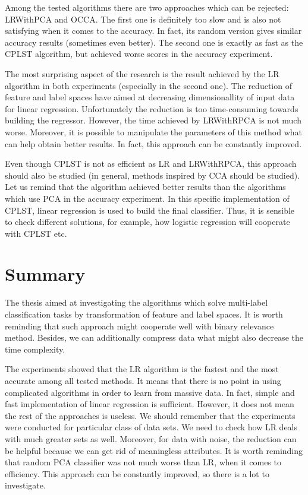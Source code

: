\documentclass[english,a4paper,twoside]{ppfcmthesis}
\begin{document}
Among the tested algorithms there are two approaches which can be rejected: LRWithPCA and OCCA. The first one is definitely too slow and is also not satisfying when it comes to the accuracy. In fact, its random version gives similar accuracy results (sometimes even better). The second one is exactly as fast as the CPLST algorithm, but achieved worse scores in the accuracy experiment. 

The most surprising aspect of the research is the result achieved by the LR algorithm in both experiments (especially in the second one). The reduction of feature and label spaces have aimed at decreasing dimensionallity of input data for linear regression. Unfortunately the reduction is too time-consuming towards building the regressor. However, the time achieved by LRWithRPCA is not much worse. Moreover, it is possible to manipulate the parameters of this method what can help obtain better results. In fact, this approach can be constantly improved.   

Even though CPLST is not as efficient as LR and LRWithRPCA, this approach should also be studied (in general, methods inspired by CCA should be studied). Let us remind that the algorithm achieved better results than the algorithms which use PCA in the accuracy experiment. In this specific implementation of CPLST, linear regression is used to build the final classifier. Thus, it is sensible to check different solutions, for example, how logistic regression will cooperate with CPLST etc.

\section{Summary}

The thesis aimed at investigating the algorithms which solve multi-label classification tasks by transformation of feature and label spaces. It is worth reminding that such approach might cooperate well with binary relevance method. Besides, we can additionally compress data what might also decrease the time complexity. 

The experiments showed that the LR algorithm is the fastest and the most accurate among all tested methods. It means that there is no point in using complicated algorithms in order to learn from massive data. In fact, simple and fast implementation of linear regression is sufficient. However, it does not mean the rest of the approaches is useless. We should remember that the experiments were conducted for particular class of data sets. We need to check how LR deals with much greater sets as well. Moreover, for data with noise, the reduction can be helpful because we can get rid of meaningless attributes. It is worth reminding that random PCA classifier was not much worse than LR, when it comes to efficiency. This approach can be constantly improved, so there is a lot to investigate.
\end{document}
